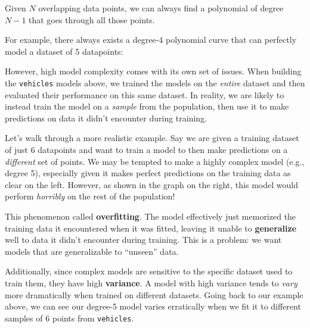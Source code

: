 \documentclass[
  letterpaper,
  DIV=11,
  numbers=noendperiod]{scrreprt}
\begin{document}
\begin{tcolorbox}[enhanced jigsaw, arc=.35mm, left=2mm, toprule=.15mm, leftrule=.75mm, bottomrule=.15mm, colframe=quarto-callout-tip-color-frame, rightrule=.15mm, colbacktitle=quarto-callout-tip-color!10!white, opacitybacktitle=0.6, coltitle=black, bottomtitle=1mm, colback=white, toptitle=1mm, title=\textcolor{quarto-callout-tip-color}{\faLightbulb}\hspace{0.5em}{Math Fact: Polynomial Degrees}, breakable, opacityback=0, titlerule=0mm]

Given \(N\) overlapping data points, we can always find a polynomial of
degree \(N-1\) that goes through all those points.

For example, there always exists a degree-4 polynomial curve that can
perfectly model a dataset of 5 datapoints:

\end{tcolorbox}

However, high model complexity comes with its own set of issues. When
building the \texttt{vehicles} models above, we trained the models on
the \emph{entire} dataset and then evaluated their performance on this
same dataset. In reality, we are likely to instead train the model on a
\emph{sample} from the population, then use it to make predictions on
data it didn't encounter during training.

Let's walk through a more realistic example. Say we are given a training
dataset of just 6 datapoints and want to train a model to then make
predictions on a \emph{different} set of points. We may be tempted to
make a highly complex model (e.g., degree 5), especially given it makes
perfect predictions on the training data as clear on the left. However,
as shown in the graph on the right, this model would perform
\emph{horribly} on the rest of the population!

This phenomenon called \textbf{overfitting}. The model effectively just
memorized the training data it encountered when it was fitted, leaving
it unable to \textbf{generalize} well to data it didn't encounter during
training. This is a problem: we want models that are generalizable to
``unseen'' data.

Additionally, since complex models are sensitive to the specific dataset
used to train them, they have high \textbf{variance}. A model with high
variance tends to \emph{vary} more dramatically when trained on
different datasets. Going back to our example above, we can see our
degree-5 model varies erratically when we fit it to different samples of
6 points from \texttt{vehicles}.
\end{document}
